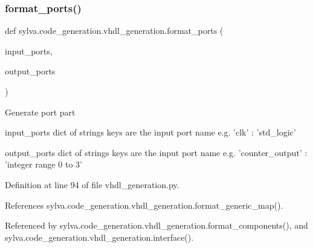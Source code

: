 \subsubsection{\texorpdfstring{format\+\_\+ports()}{format\_ports()}}
{\footnotesize\ttfamily def sylva.\+code\+\_\+generation.\+vhdl\+\_\+generation.\+format\+\_\+ports (\begin{DoxyParamCaption}\item[{}]{input\+\_\+ports,  }\item[{}]{output\+\_\+ports }\end{DoxyParamCaption})}

\begin{DoxyVerb}Generate port part

  input_ports
    dict of strings
    keys are the input port name
    e.g. { 'clk' : 'std_logic' }

  output_ports
    dict of strings
    keys are the input port name
    e.g. { 'counter_output' : 'integer range 0 to 3' }
\end{DoxyVerb}
 

Definition at line 94 of file vhdl\+\_\+generation.\+py.



References sylva.\+code\+\_\+generation.\+vhdl\+\_\+generation.\+format\+\_\+generic\+\_\+map().



Referenced by sylva.\+code\+\_\+generation.\+vhdl\+\_\+generation.\+format\+\_\+components(), and sylva.\+code\+\_\+generation.\+vhdl\+\_\+generation.\+interface().


